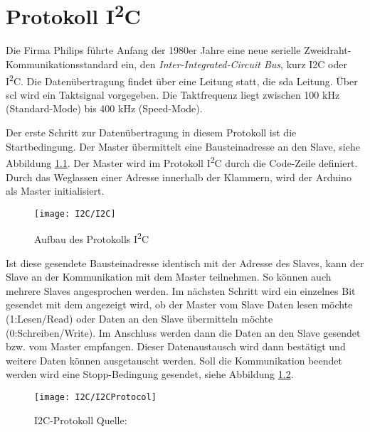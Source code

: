 %
%
%

\chapter{Protokoll I\textsuperscript{2}C}


 
Die Firma Philips führte Anfang der 1980er Jahre eine neue serielle Zweidraht-Kommunikationsstandard ein, den \textit{Inter-Integrated-Circuit Bus}, kurz I2C oder I\textsuperscript{2}C. Die Datenübertragung findet über eine Leitung statt, die \ac{sda} Leitung. Über \ac{scl} wird ein Taktsignal vorgegeben. Die Taktfrequenz liegt zwischen 100 kHz (Standard-Mode) bis 400 kHz (Speed-Mode). 

Der erste Schritt zur Datenübertragung in diesem Protokoll ist die Startbedingung. Der Master übermittelt eine Bausteinadresse an den Slave, siehe Abbildung \ref{fig:I2C-Aufbau}\cite{Gehrke:2022}. Der Master wird im Protokoll I\textsuperscript{2}C durch die Code-Zeile  definiert. Durch das Weglassen einer Adresse innerhalb der Klammern, wird der Arduino als Master initialisiert\cite{ArduinoWire:2022}.

\begin{figure}[H] 
    \centering 
    \texttt{[image: I2C/I2C]}
    \caption[Aufbau des Protokolls I\textsuperscript{2}C]{Aufbau des Protokolls I\textsuperscript{2}C \cite{Gehrke:2022}}
    \label{fig:I2C-Aufbau}
\end{figure}

Ist diese gesendete Bausteinadresse identisch mit der Adresse des Slaves,  kann der Slave an der Kommunikation mit dem Master teilnehmen. So können auch mehrere Slaves angesprochen werden. Im nächsten Schritt wird ein einzelnes Bit gesendet mit dem angezeigt wird, ob der Master vom Slave Daten lesen möchte (1:Lesen/Read) oder Daten an den Slave übermitteln möchte (0:Schreiben/Write). Im Anschluss werden dann die Daten an den Slave gesendet bzw. vom Master empfangen. Dieser Datenaustausch wird dann bestätigt und weitere Daten können ausgetauscht werden. Soll die Kommunikation beendet werden wird eine Stopp-Bedingung gesendet, siehe Abbildung \ref{fig:I2C-Protokoll}. \cite{Gehrke:2022}  

\begin{figure}[H] 
    \centering 
    \texttt{[image: I2C/I2CProtocol]}
    \caption{I2C-Protokoll Quelle: \cite{Gehrke:2022}}
    \label{fig:I2C-Protokoll}
\end{figure}


